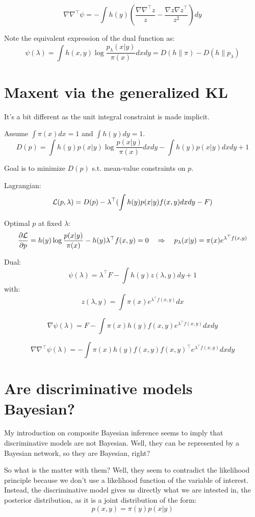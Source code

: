 \documentclass{article}
\begin{document}
$$
\nabla\nabla^\top\psi
= - \int h(y) \left(
\frac{\nabla \nabla^\top z}{z} 
-
\frac{\nabla z \nabla z^\top}{z^2}
\right)
dy
$$

Note the equivalent expression of the dual function as:
$$
\psi(\lambda)
=
\int h(x,y) \log \frac{p_\lambda(x|y)}{\pi(x)} dx dy
= D(h\|\pi) - D(h\|p_\lambda)
$$


\section{Maxent via the generalized KL}

It's a bit different as the unit integral constraint is made implicit.

Assume $\int\pi(x)dx=1$ and $\int h(y) dy = 1$. 
$$
D(p) 
= \int h(y)p(x|y) \log \frac{p(x|y)}{\pi(x)} dxdy
- \int h(y)p(x|y)dx dy
+ 1
$$

Goal is to minimize $D(p)$ s.t. mean-value constraints on $p$. 

Lagrangian:
$$
{\cal L}(p,\lambda) = D(p) -\lambda^\top (\int h(y)p(x|y)f(x,y)dxdy - F)
$$

Optimal $p$ at fixed $\lambda$:
$$
\frac{\partial{\cal L}}{\partial p}
=
h(y) \log \frac{p(x|y)}{\pi(x)} - h(y) \lambda^\top f(x,y)
= 0
\quad
\Rightarrow
\quad
p_{\lambda}(x|y) = \pi(x) e^{\lambda^\top f(x,y)}
$$

Dual:
$$
\psi(\lambda) = \lambda^\top F - \int h(y)z(\lambda, y) dy + 1
$$
with:
$$
z(\lambda,y) = \int \pi(x) e^{\lambda^\top f(x,y)} dx
$$

$$
\nabla\psi(\lambda)
= F - \int \pi(x) h(y) f(x,y) e^{\lambda^\top f(x,y)} dx dy
$$

$$
\nabla\nabla^\top\psi(\lambda)
= - \int \pi(x) h(y) f(x,y)f(x,y)^\top e^{\lambda^\top f(x,y)} dx dy
$$


\section{Are discriminative models Bayesian?}

My introduction on composite Bayesian inference seems to imply that discriminative models are not Bayesian. Well, they can be represented by a Bayesian network, so they are Bayesian, right? 

So what is the matter with them? Well, they seem to contradict the likelihood principle because we don't use a likelihood function of the variable of interest. Instead, the discriminative model gives us directly what we are intested in, the posterior distribution, as it is a joint distribution of the form:
$$
p(x,y) = \pi(y) p(x|y)
$$
\end{document}
